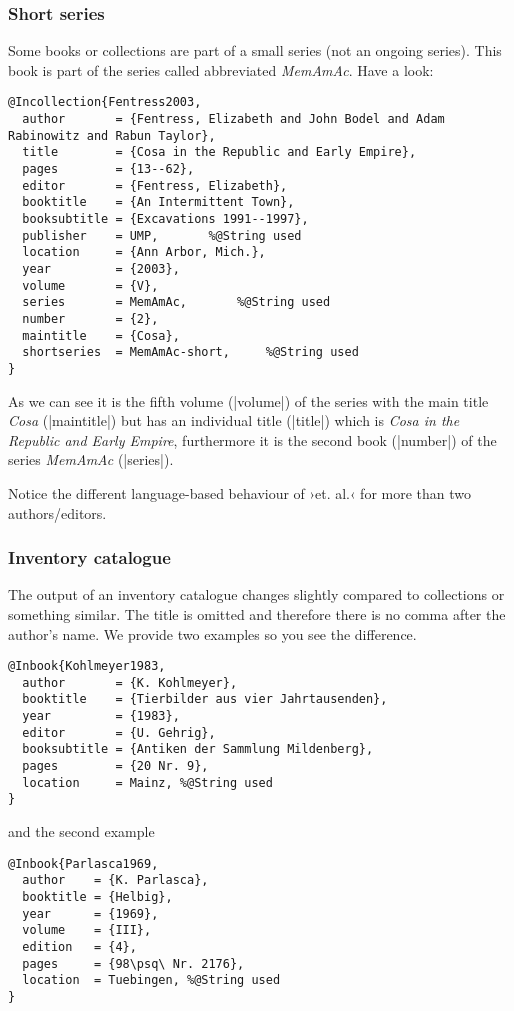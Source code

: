 \documentclass[a4paper,
10pt,
greek,
french,
spanish,
italian,
ngerman,
english
]{ltxdoc}
\begin{document}
\subsubsection{Short series}
Some books or collections are part of a small series (not an ongoing series).
This book is part of the series called abbreviated \emph{MemAmAc}.
Have a look:
\begin{lstlisting}[style=bibentry,label=Fentress2003,caption={{@}Incollection\{Fentress2003,…\} }]
@Incollection{Fentress2003,
  author       = {Fentress, Elizabeth and John Bodel and Adam Rabinowitz and Rabun Taylor},
  title        = {Cosa in the Republic and Early Empire},
  pages        = {13--62},
  editor       = {Fentress, Elizabeth},
  booktitle    = {An Intermittent Town},
  booksubtitle = {Excavations 1991--1997},
  publisher    = UMP,		%@String used
  location     = {Ann Arbor, Mich.},
  year         = {2003},
  volume       = {V},
  series       = MemAmAc,		%@String used
  number       = {2},
  maintitle    = {Cosa},
  shortseries  = MemAmAc-short,		%@String used
}
\end{lstlisting}
As we can see it is the fifth volume (|volume|) of the series with the main title 
\emph{Cosa} (|maintitle|) but has an individual title (|title|) which is
\emph{Cosa in the Republic and Early Empire}, furthermore it is the second book (|number|) 
of the series  \emph{MemAmAc} (|series|).

Notice the different language-based behaviour of ›et. al.‹ for more than two authors/editors.

 
\subsubsection{Inventory catalogue}
The output of an inventory catalogue changes slightly compared to collections or something similar. 
The title is omitted and therefore there is no comma after the author’s name.
We provide two examples so you see the difference.
\begin{lstlisting}[style=bibentry,label=Kohlmeyer1983,caption={{@}Inbook\{Kohlmeyer1983,…\} }]
@Inbook{Kohlmeyer1983,
  author       = {K. Kohlmeyer},
  booktitle    = {Tierbilder aus vier Jahrtausenden},
  year         = {1983},
  editor       = {U. Gehrig},
  booksubtitle = {Antiken der Sammlung Mildenberg},
  pages        = {20 Nr. 9},
  location     = Mainz, %@String used
}
\end{lstlisting}
and the second example

\begin{lstlisting}[style=bibentry,label=Parlasca1969,caption={{@}Inbook\{Parlasca1969,…\} }]
@Inbook{Parlasca1969,
  author    = {K. Parlasca},
  booktitle = {Helbig},
  year      = {1969},
  volume    = {III},
  edition   = {4},
  pages     = {98\psq\ Nr. 2176},
  location  = Tuebingen, %@String used
}
\end{lstlisting}
\end{document}
